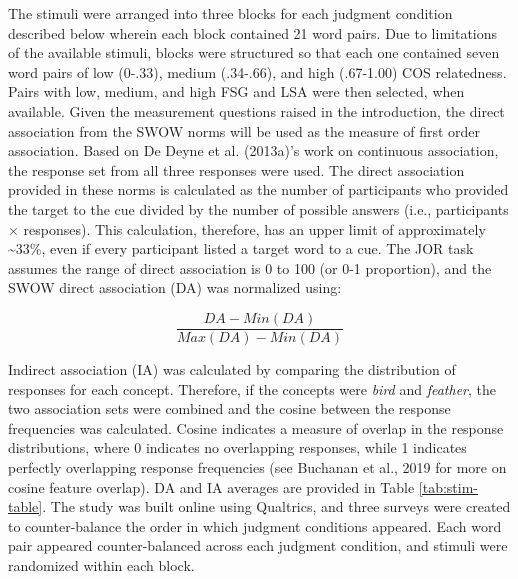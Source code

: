 \documentclass[english,,man]{apa6}
\begin{document}
The stimuli were arranged into three blocks for each judgment condition described below wherein each block contained 21 word pairs. Due to limitations of the available stimuli, blocks were structured so that each one contained seven word pairs of low (0-.33), medium (.34-.66), and high (.67-1.00) COS relatedness. Pairs with low, medium, and high FSG and LSA were then selected, when available. Given the measurement questions raised in the introduction, the direct association from the SWOW norms will be used as the measure of first order association. Based on De Deyne et al. (2013a)'s work on continuous association, the response set from all three responses were used. The direct association provided in these norms is calculated as the number of participants who provided the target to the cue divided by the number of possible answers (i.e., participants \(\times\) responses). This calculation, therefore, has an upper limit of approximately \textasciitilde{}33\%, even if every participant listed a target word to a cue. The JOR task assumes the range of direct association is 0 to 100 (or 0-1 proportion), and the SWOW direct association (DA) was normalized using:

\[\frac{DA - Min(DA)} {Max(DA) - Min(DA)}\]

Indirect association (IA) was calculated by comparing the distribution of responses for each concept. Therefore, if the concepts were \emph{bird} and \emph{feather}, the two association sets were combined and the cosine between the response frequencies was calculated. Cosine indicates a measure of overlap in the response distributions, where 0 indicates no overlapping responses, while 1 indicates perfectly overlapping response frequencies (see Buchanan et al., 2019 for more on cosine feature overlap). DA and IA averages are provided in Table \ref{tab:stim-table}. The study was built online using Qualtrics, and three surveys were created to counter-balance the order in which judgment conditions appeared. Each word pair appeared counter-balanced across each judgment condition, and stimuli were randomized within each block.
\end{document}
